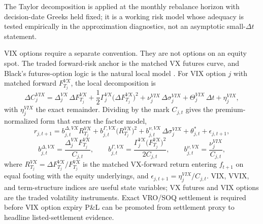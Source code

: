 \begin{remark}\label{rem:horizon}
The Taylor decomposition is applied at the monthly rebalance horizon with decision-date
Greeks held fixed; it is a working risk model whose adequacy is tested empirically in the
approximation diagnostics, not an asymptotic small-\(\Delta t\) statement.
\end{remark}

VIX options require a separate convention. They are not options on an equity spot. The
traded forward-risk anchor is the matched VX futures curve, and Black's futures-option
logic is the natural local model \citep{black1976commodity}. For VIX option \(j\) with
matched forward \(F^{VX}_{T_j}\), the local decomposition is
\[
  \Delta C^{VIX}_j
  =
  \Delta^{VX}_j\,\Delta F^{VX}_{T_j}
  +\frac12\Gamma^{VX}_j\bigl(\Delta F^{VX}_{T_j}\bigr)^2
  +\nu^{VIX}_j\,\Delta\sigma^{VIX}_j
  +\Theta^{VIX}_j\,\Delta t
  +\eta^{VIX}_j,
\]
with \(\eta^{VIX}_j\) the exact remainder. Dividing by the mark \(C_{j,t}\) gives the
premium-normalized form that enters the factor model,
\[
  r_{j,t+1}
  =b^{\Delta,VX}_{j,t}R^{VX}_{T_j}
  +b^{\Gamma,VX}_{j,t}\bigl(R^{VX}_{T_j}\bigr)^2
  +b^{\nu,VX}_{j,t}\,\Delta\sigma^{VIX}_j
  +\theta^{\ast}_{j,t}
  +\epsilon_{j,t+1},
\]
\[
  b^{\Delta,VX}_{j,t}=\frac{\Delta^{VX}_j F^{VX}_{T_j}}{C_{j,t}},\qquad
  b^{\Gamma,VX}_{j,t}=\frac{\Gamma^{VX}_j\bigl(F^{VX}_{T_j}\bigr)^2}{2C_{j,t}},\qquad
  b^{\nu,VX}_{j,t}=\frac{\nu^{VIX}_j}{C_{j,t}},
\]
where \(R^{VX}_{T_j}=\Delta F^{VX}_{T_j}/F^{VX}_{T_j}\) is the matched VX-forward return
entering \(f_{t+1}\) on equal footing with the equity underlyings, and
\(\epsilon_{j,t+1}=\eta^{VIX}_j/C_{j,t}\). VIX, VVIX, and term-structure indices are useful
state variables; VX futures and VIX options are the traded volatility instruments. Exact
VRO/SOQ settlement is required before VIX option expiry P\&L can be promoted from
settlement proxy to headline listed-settlement evidence.
